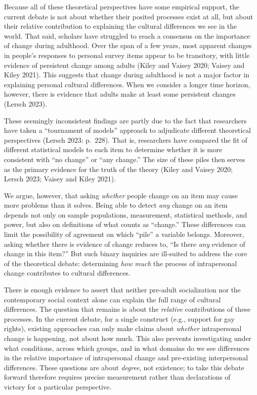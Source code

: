 \documentclass[
  12pt,
]{article}
\begin{document}
Because all of these theoretical perspectives have some empirical
support, the current debate is not about whether their posited processes
exist at all, but about their relative contribution to explaining the
cultural differences we see in the world. That said, scholars have
struggled to reach a consensus on the importance of change during
adulthood. Over the span of a few years, most apparent changes in
people's responses to personal survey items appear to be transitory,
with little evidence of persistent change among adults (Kiley and Vaisey
2020; Vaisey and Kiley 2021). This suggests that change during adulthood
is not a major factor in explaining personal cultural differences. When
we consider a longer time horizon, however, there is evidence that
adults make at least some persistent changes (Lersch 2023).

These seemingly inconsistent findings are partly due to the fact that
researchers have taken a ``tournament of models'' approach to adjudicate
different theoretical perspectives (Lersch 2023: p.~228). That is,
researchers have compared the fit of different statistical models to
each item to determine whether it is more consistent with ``no change''
or ``any change.'' The size of these piles then serves as the primary
evidence for the truth of the theory (Kiley and Vaisey 2020; Lersch
2023; Vaisey and Kiley 2021).

We argue, however, that asking \emph{whether} people change on an item
may cause more problems than it solves. Being able to detect \emph{any}
change on an item depends not only on sample populations, measurement,
statistical methods, and power, but also on definitions of what counts
as ``change.'' These differences can limit the possibility of agreement
on which ``pile'' a variable belongs. Moreover, asking whether there is
evidence of change reduces to, ``Is there \emph{any} evidence of change
in this item?'' But such binary inquiries are ill-suited to address the
core of the theoretical debate: determining \emph{how much} the process
of intrapersonal change contributes to cultural differences.

There is enough evidence to assert that neither pre-adult socialization
nor the contemporary social context alone can explain the full range of
cultural differences. The question that remains is about the
\emph{relative} contributions of these processes. In the current debate,
for a single construct (e.g., support for gay rights), existing
approaches can only make claims about \emph{whether} intrapersonal
change is happening, not about how much. This also prevents
investigating under what conditions, across which groups, and in what
domains do we see differences in the relative importance of
intrapersonal change and pre-existing interpersonal differences. These
questions are about \emph{degree}, not existence; to take this debate
forward therefore requires precise measurement rather than declarations
of victory for a particular perspective.
\end{document}
